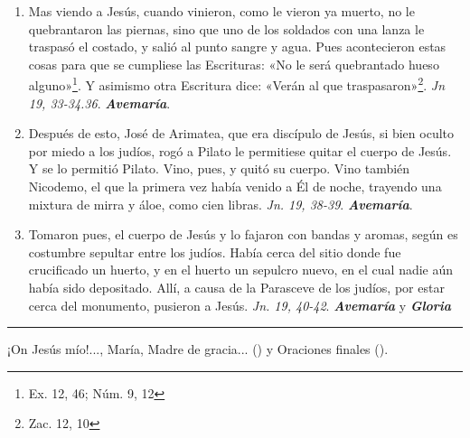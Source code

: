 \documentclass[./rosary.tex]{subfiles}
\begin{document}
\begin{enumerate}
      \item Mas viendo a Jesús, cuando vinieron, como le vieron ya muerto, no le quebrantaron las piernas, sino que uno de los soldados
            con una lanza le traspasó el costado, y salió al punto sangre y agua. Pues acontecieron estas cosas para que se cumpliese las
            Escrituras: «No le será quebrantado hueso alguno»\footnote{Ex. 12, 46; Núm. 9, 12}. Y asimismo otra Escritura dice: «Verán al que
            traspasaron»\footnote{Zac. 12, 10}. \emph{Jn 19, 33-34.36}. \textbf{\emph{Avemaría}}.

      \item Después de esto, José de Arimatea, que era discípulo de Jesús, si bien oculto por miedo a los judíos, rogó a Pilato le permitiese
            quitar el cuerpo de Jesús. Y se lo permitió Pilato. Vino, pues, y quitó su cuerpo. Vino también Nicodemo, el que la primera vez había
            venido a Él de noche, trayendo una mixtura de mirra y áloe, como cien libras.
            \emph{Jn. 19, 38-39}. \textbf{\emph{Avemaría}}.

      \item Tomaron pues, el cuerpo de Jesús y lo fajaron con bandas y aromas, según es costumbre sepultar entre los judíos. Había cerca
            del sitio donde fue crucificado un huerto, y en el huerto un sepulcro nuevo, en el cual nadie aún había sido depositado.
            Allí, a causa de la Parasceve de los judíos, por estar cerca del monumento, pusieron a Jesús.
            \emph{Jn. 19, 40-42}. \textbf{\emph{Avemaría}} y \textbf{\emph{Gloria}}
\end{enumerate}

\rule{\textwidth}{0.5pt}
¡On Jesús mío!..., María, Madre de gracia... () y Oraciones finales ().
\end{document}
